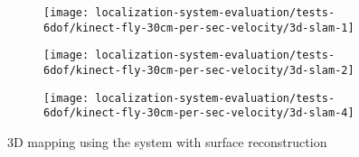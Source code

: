 \begin{figure}[H]
	\centering
	\begin{subfigure}[ht]{0.42\textwidth}
		\centering
		\texttt{[image: localization-system-evaluation/tests-6dof/kinect-fly-30cm-per-sec-velocity/3d-slam-1]}
	\end{subfigure}
	\begin{subfigure}[ht]{0.42\textwidth}
		\centering
		\texttt{[image: localization-system-evaluation/tests-6dof/kinect-fly-30cm-per-sec-velocity/3d-slam-2]}
	\end{subfigure}
	\begin{subfigure}[ht]{0.42\textwidth}
		\centering
		\texttt{[image: localization-system-evaluation/tests-6dof/kinect-fly-30cm-per-sec-velocity/3d-slam-4]}
	\end{subfigure}
	\caption{3D mapping using the  system with surface reconstruction}
	\label{fig:localization-system-evaluation_kinect-fly-30cm-per-sec-velocity-drl-slam}
\end{figure}
